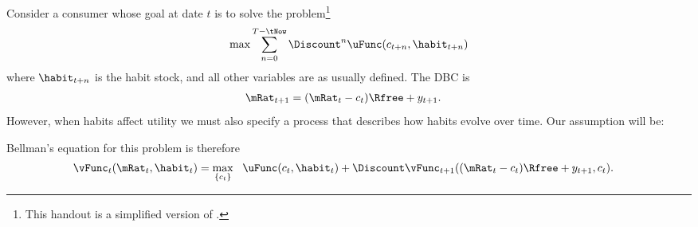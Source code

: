 
Consider a consumer whose goal at date $t$ is to solve the problem\footnote{This handout is a simplified version of \cite{carroll:solvinghabits}.}
\begin{equation}
        \max \sum_{n=0}^{T-\tNow} \Discount^{n} \uFunc(c_{t+n},\habit_{t+n})
\end{equation}
where $\habit_{t+n}$ is the habit stock, and all other variables are as
usually defined.  The DBC is 
\begin{equation}\begin{gathered}\begin{aligned}
 \mRat_{t+1} & =  (\mRat_{t}-c_{t})\Rfree + y_{t+1}. \label{eq:xaccum}
\end{aligned}\end{gathered}\end{equation}
However, when habits affect utility we must also specify a process
that describes how habits evolve over time.  Our assumption will be:

Bellman's equation for this problem is therefore
\begin{equation}\begin{gathered}\begin{aligned}
\vFunc_{t}(\mRat_{t},\habit_{t}) & =   \max_{\{c_{t}\}} ~~\uFunc(c_{t},\habit_{t})
+  \Discount \vFunc_{t+1}((\mRat_{t}-c_{t})\Rfree+y_{t+1},c_{t}).  \label{eq:bellmanmax}
\end{aligned}\end{gathered}\end{equation}

